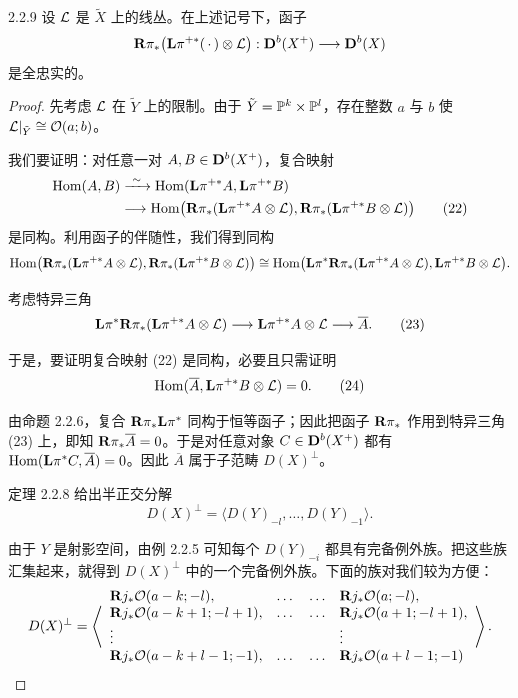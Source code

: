 \begin{theorem}{2.2.9}
设 $\mathcal{L}$ 是 $\tilde X$ 上的线丛。在上述记号下，函子
\[
\mathbf{R}\pi_*\bigl(\mathbf{L}\pi^{+*}(\,\cdot\,)\otimes\mathcal{L}\bigr):\mathbf{D}^{b}(X^+)\longrightarrow\mathbf{D}^{b}(X)
\]
是全忠实的。
\end{theorem}

\begin{proof}
先考虑 $\mathcal{L}$ 在 $\tilde Y$ 上的限制。由于 $\tilde Y=\mathbb{P}^k\times\mathbb{P}^l$，存在整数 $a$ 与 $b$ 使 $\mathcal{L}|_{\tilde Y}\cong\mathcal{O}(a;b)$。

我们要证明：对任意一对 $A,B\in\mathbf{D}^{b}(X^+)$，复合映射
\begin{align}
\Hom(A,B)&\xrightarrow{\ \sim\ }\Hom(\Lf\pi^{+*}A,\Lf\pi^{+*}B)\notag\\
&\longrightarrow\Hom\bigl(\Rf\pi_*(\Lf\pi^{+*}A\otimes\cL),\Rf\pi_*(\Lf\pi^{+*}B\otimes\cL)\bigr)
\tag{22}
\end{align}
是同构。利用函子的伴随性，我们得到同构
\[
\operatorname{Hom}\bigl(\mathbf{R}\pi_*(\mathbf{L}\pi^{+*}A\otimes\mathcal{L}),\mathbf{R}\pi_*(\mathbf{L}\pi^{+*}B\otimes\mathcal{L})\bigr)
\cong\operatorname{Hom}\bigl(\mathbf{L}\pi^*\mathbf{R}\pi_*(\mathbf{L}\pi^{+*}A\otimes\mathcal{L}),\mathbf{L}\pi^{+*}B\otimes\mathcal{L}\bigr).
\]

考虑特异三角
\begin{equation}
\mathbf{L}\pi^*\mathbf{R}\pi_*(\mathbf{L}\pi^{+*}A\otimes\mathcal{L})\longrightarrow\mathbf{L}\pi^{+*}A\otimes\mathcal{L}\longrightarrow\overline A.
\tag{23}
\end{equation}

于是，要证明复合映射 (22) 是同构，必要且只需证明
\begin{equation}
\operatorname{Hom}(\overline A,\mathbf{L}\pi^{+*}B\otimes\mathcal{L})=0.
\tag{24}
\end{equation}

由命题 2.2.6，复合 $\mathbf{R}\pi_*\mathbf{L}\pi^*$ 同构于恒等函子；因此把函子 $\mathbf{R}\pi_*$ 作用到特异三角 (23) 上，即知 $\mathbf{R}\pi_*\overline A=0$。于是对任意对象 $C\in\mathbf{D}^{b}(X^+)$ 都有 $\operatorname{Hom}(\mathbf{L}\pi^*C,\overline A)=0$。因此 $\overline A$ 属于子范畴 $D(X)^{\perp}$。

定理 2.2.8 给出半正交分解
\[
D(X)^{\perp}=\bigl\langle D(Y)_{-l},\dots,D(Y)_{-1}\bigr\rangle.
\]

由于 $Y$ 是射影空间，由例 2.2.5 可知每个 $D(Y)_{-i}$ 都具有完备例外族。把这些族汇集起来，就得到 $D(X)^{\perp}$ 中的一个完备例外族。下面的族对我们较为方便：
\[
D(X)^{\perp}=\left\langle
\begin{array}{l@{\quad}c@{\quad}l}
\Rf j_*\cO(a-k;-l), & \dots\quad\dots & \Rf j_*\cO(a;-l),\\
\Rf j_*\cO(a-k+1;-l+1), & \dots\quad\dots & \Rf j_*\cO(a+1;-l+1),\\
\vdots & & \vdots\\
\Rf j_*\cO(a-k+l-1;-1), & \dots\quad\dots & \Rf j_*\cO(a+l-1;-1)
\end{array}\right\rangle.
\]


\end{proof}
